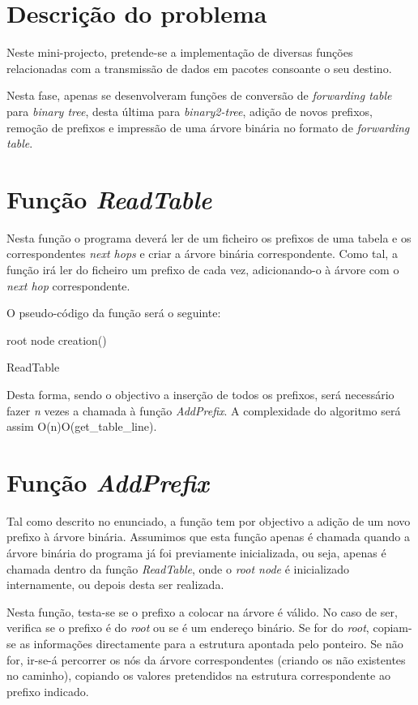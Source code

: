 \documentclass[a4paper]{article}
\begin{document}

\section{Descrição do problema}
Neste mini-projecto, pretende-se a implementação de diversas funções relacionadas com a transmissão de dados em pacotes consoante
o seu destino.

Nesta fase, apenas se desenvolveram funções de conversão de \textit{forwarding table} para \textit{binary tree}, desta última para
\textit{binary2-tree}, adição de novos prefixos, remoção de prefixos e impressão de uma árvore binária no formato de
\textit{forwarding table}.

\section{Função \textit{ReadTable}}
Nesta função o programa deverá ler de um ficheiro os prefixos de uma tabela e os correspondentes \textit{next hops} e criar a 
árvore binária correspondente.
Como tal, a função irá ler do ficheiro um prefixo de cada vez, adicionando-o à árvore com o \textit{next hop} correspondente.

O pseudo-código da função será o seguinte:

\begin{algorithm}[H]
 root node creation()\;
 \caption{ReadTable}
\end{algorithm}
Desta forma, sendo o objectivo a inserção de todos os prefixos, será necessário fazer \textit{n} vezes a chamada à função \textit{AddPrefix}. A complexidade do algoritmo será assim O(n)O(get\_table\_line).

\section{Função \textit{AddPrefix}}
Tal como descrito no enunciado, a função tem por objectivo a adição de um novo prefixo à árvore binária. Assumimos que esta função apenas é chamada quando a árvore binária do programa já foi previamente inicializada, ou seja, apenas é chamada dentro da função \textit{ReadTable}, onde o \textit{root node} é inicializado internamente, ou depois desta ser realizada.

Nesta função, testa-se se o prefixo a colocar na árvore é válido. No caso de ser, verifica se o prefixo é do \textit{root} ou se é um endereço binário. Se for do \textit{root}, copiam-se as informações directamente para a estrutura apontada pelo ponteiro. Se não for, ir-se-á percorrer os nós da árvore correspondentes (criando os não existentes no caminho), copiando os valores pretendidos na estrutura correspondente ao prefixo indicado.
\end{document}
